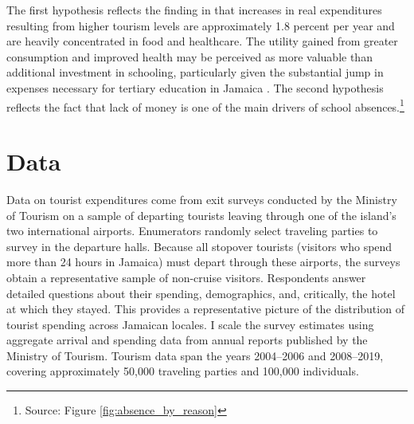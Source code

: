 \documentclass[12pt]{article}
\renewcommand\footnotesize{\fontsize{11}{13}\selectfont}
\begin{document}
The first hypothesis reflects the finding in \textcite{mcketty_sun_2026} that increases in real expenditures resulting from higher tourism levels are approximately 1.8 percent per year and are heavily concentrated in food and healthcare. The utility gained from greater consumption and improved health may be perceived as more valuable than additional investment in schooling, particularly given the substantial jump in expenses necessary for tertiary education in Jamaica \parencite{the_world_bank_public_2021}. The second hypothesis reflects the fact that lack of money is one of the main drivers of school absences.\footnote{\footnotesize Source: Figure \ref{fig:absence_by_reason}}

	
	
	
	\section{Data}
	\label{section:data}
	
	Data on tourist expenditures come from exit surveys conducted by the Ministry of Tourism on a sample of departing tourists leaving through one of the island’s two international airports. Enumerators randomly select traveling parties to survey in the departure halls. Because all stopover tourists (visitors who spend more than 24 hours in Jamaica) must depart through these airports, the surveys obtain a representative sample of non-cruise visitors. Respondents answer detailed questions about their spending, demographics, and, critically, the hotel at which they stayed. This provides a representative picture of the distribution of tourist spending across Jamaican locales. I scale the survey estimates using aggregate arrival and spending data from annual reports published by the Ministry of Tourism. Tourism data span the years 2004–2006 and 2008–2019, covering approximately 50,000 traveling parties and 100,000 individuals.
	
\end{document}
